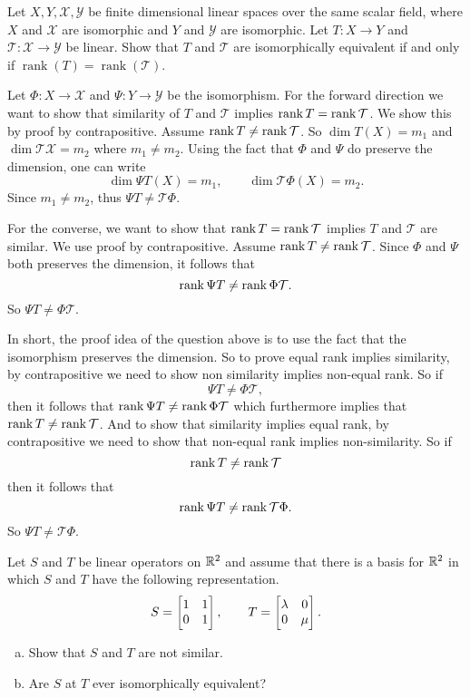 \begin{problem}
	Let $ X,Y, \mathcal{X},\mathcal{Y} $ be finite dimensional linear spaces over the same scalar field, where $ X $ and $ \mathcal{X} $ are isomorphic and $ Y $ and $ \mathcal{Y} $ are isomorphic. Let $ T:X\to Y $ and $ \mathcal{T}:\mathcal{X}\to\mathcal{Y} $ be linear. Show that $ T $ and $ \mathcal{T} $ are isomorphically equivalent if and only if $ \operatorname{rank}(T) = \operatorname{rank}(\mathcal{T}) $.
\end{problem}
\begin{solution}
	Let $ \Phi:X\to\mathcal{X} $ and $ \Psi:Y\to\mathcal{Y} $ be the isomorphism.
	For the forward direction we want to show that similarity of $ T $ and $ \mathcal{T} $ implies $ \operatorname{rank} T = \operatorname{rank}\mathcal{T} $. We show this by proof by contrapositive. Assume $ \operatorname{rank} T \neq \operatorname{rank}\mathcal{T} $. So $ \dim T(X) = m_1 $ and $ \dim \mathcal{T}\mathcal{X} = m_2 $ where $ m_1\neq m_2 $. Using the fact that $ \Phi $ and $ \Psi $ do preserve the dimension, one can write
	\[ \dim \Psi T(X) = m_1,\qquad  \dim \mathcal{T}\Phi(X) = m_2. \]
	Since $ m_1\neq m_2 $, thus $ \Psi T \neq \mathcal{T}\Phi $. 
	
	For the converse, we want to show that $ \operatorname{rank} T = \operatorname{rank}\mathcal{T} $ implies $ T $ and $ \mathcal{T} $ are similar.  We use proof by contrapositive. Assume $ \operatorname{rank} T \neq \operatorname{rank} \mathcal{T} $. Since $ \Phi $ and $ \Psi $ both preserves the dimension, it follows that 
	\[ \rank \Psi T \neq \rank \Phi\mathcal{T}. \]
	So $ \Psi T \neq \Phi \mathcal{T}. $
\end{solution}
\begin{remark}
	In short, the proof idea of the question above is to use the fact that the isomorphism preserves the dimension. So to prove equal rank implies similarity, by contrapositive we need to show non similarity implies non-equal rank. So if
	\[ \Psi T \neq \Phi \mathcal{T}, \]
	then it follows that $ \rank \Psi T \neq \rank \Phi\mathcal{T} $ which furthermore implies that $ \rank T \neq \rank \mathcal{T} $. And to show that similarity implies equal rank, by contrapositive we need to show that non-equal rank implies non-similarity. So if
	\[  \rank T \neq \rank \mathcal{T} \]
	then it follows that 
	\[ \rank \Psi T \neq \rank \mathcal{T}\Phi. \]
	So $ \Psi T \neq \mathcal{T}\Phi $.
\end{remark}

\begin{problem}
	Let $ S $ and $ T $ be linear operators on $ \mathbb{R}^2 $ and assume that there is a basis for $ \mathbb{R}^2 $ in which $ S $ and $ T $ have the following representation.
	\[ S = \begin{bmatrix} 1 & 1 \\ 0 & 1 \end{bmatrix},\qquad T = \begin{bmatrix} \lambda & 0 \\ 0 & \mu \end{bmatrix}. \]
	\begin{enumerate}[(a)]
		\item Show that $ S $ and $ T $ are not similar.
		\item Are $ S $ at $ T $ ever isomorphically equivalent?
	\end{enumerate}
\end{problem}

